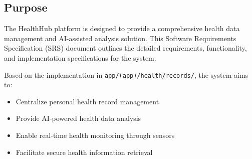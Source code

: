 \subsection{Purpose}
The HealthHub platform is designed to provide a comprehensive health data management and AI-assisted analysis solution. This Software Requirements Specification (SRS) document outlines the detailed requirements, functionality, and implementation specifications for the system.

Based on the implementation in \texttt{app/(app)/health/records/}, the system aims to:
\begin{itemize}
    \item Centralize personal health record management
    \item Provide AI-powered health data analysis
    \item Enable real-time health monitoring through sensors
    \item Facilitate secure health information retrieval
\end{itemize} 